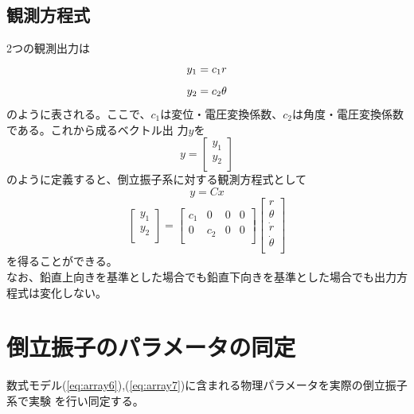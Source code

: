 \subsection{観測方程式}
	2つの観測出力は
	\begin{equation}
		y_{1} = c_{1}r\\
	\end{equation}
	\begin{equation}
		y_{2} = c_{2}\theta\\
	\end{equation}
	のように表される。ここで、$c_{1}$は変位・電圧変換係数、$c_{2}$は角度・電圧変換係数である。これから成るベクトル出
	力$y$を\\
	\begin{equation}
		y=\left[
		\begin{array}{c}
			y_{1}\\
			y_{2}\\
		\end{array}
		\right]
	\end{equation}
	のように定義すると、倒立振子系に対する観測方程式として\\
	\begin{equation}
		y=Cx
	\end{equation}
	\begin{equation}
		\left[
		\begin{array}{c}
			y_{1}\\
			y_{2}\\
		\end{array}
		\right]=\left[
		\begin{array}{cccc}
			c_{1} & 0 & 0 & 0 \\
			0 & c_{2} & 0 & 0\\
		\end{array}
		\right]\left[
		\begin{array}{c}
			r\\
			\theta\\
			\dot{r}\\
			\dot{\theta}\\
		\end{array}
		\right]
	\end{equation}
	を得ることができる。\\
	なお、鉛直上向きを基準とした場合でも鉛直下向きを基準とした場合でも出力方程式は変化しない。
\section{倒立振子のパラメータの同定}
数式モデル(\ref{eq:array6}),(\ref{eq:array7})に含まれる物理パラメータを実際の倒立振子系で実験
を行い同定する。

